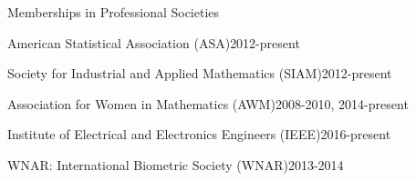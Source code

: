\documentclass{resume} %
\begin{document}

\begin{rSection}{Memberships in Professional Societies}
\begin{esSubsection}{American Statistical Association }{(ASA)}{2012-present}{}{}
\end{esSubsection}

\begin{esSubsection}{Society for Industrial and Applied Mathematics }{(SIAM)}{2012-present}{}{}
\end{esSubsection}

\begin{esSubsection}{Association for Women in Mathematics }{(AWM)}{2008-2010, 2014-present}{}{}
\end{esSubsection}

\begin{esSubsection}{Institute of Electrical and Electronics Engineers }{(IEEE)}{2016-present}{}{}
\end{esSubsection}

\begin{esSubsection}{WNAR: International Biometric Society }{(WNAR)}{2013-2014}{}{}
\end{esSubsection}


\end{rSection}




\end{document}
